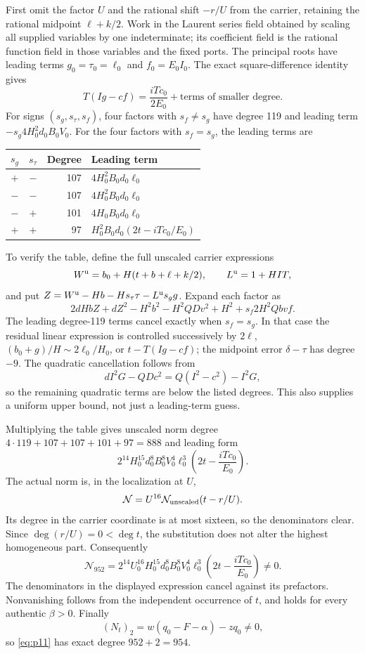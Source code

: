 \documentclass[11pt,a4paper]{article}
\theoremstyle{definition}
\theoremstyle{remark}
\numberwithin{equation}{section}
\begin{document}
First omit the factor $U$ and the rational shift $-r/U$ from the
carrier, retaining the rational midpoint $\ell+k/2$. Work in the
Laurent series field obtained by scaling all supplied variables by
one indeterminate; its coefficient field is the rational function
field in those variables and the fixed ports. The principal roots
have leading terms $g_0=\tau_0=\ell_0$ and $f_0=E_0I_0$.
The exact square-difference identity gives
\[
 T(Ig-cf)=\frac{iTc_0}{2E_0}+\text{terms of smaller degree}.
\]
For signs $(s_g,s_\tau,s_f)$, four factors with $s_f\ne s_g$
have degree 119 and leading term
$-s_g4H_0^2d_0B_0V_0$.
For the four factors with $s_f=s_g$, the leading terms are
\begin{center}
\begin{tabular}{@{}ccrl@{}}
\toprule
$s_g$ & $s_\tau$ & Degree & Leading term\\
\midrule
$+$ & $-$ & 107 & $4H_0^2B_0d_0\ell_0$\\
$-$ & $-$ & 107 & $4H_0^2B_0d_0\ell_0$\\
$-$ & $+$ & 101 & $4H_0B_0d_0\ell_0$\\
$+$ & $+$ & 97 & $H_0^2B_0d_0(2t-iTc_0/E_0)$\\
\bottomrule
\end{tabular}
\end{center}
To verify the table, define the full unscaled carrier expressions
\[
 W^{\rm u}=b_0+H(t+b+\ell+k/2),\qquad
 L^{\rm u}=1+HIT,
\]
and put $Z=W^{\rm u}-Hb-Hs_\tau\tau-L^{\rm u}s_gg$.
Expand each factor as
\[
 2dHbZ+dZ^2-H^2b^2-H^2QDv^2+H^2
       +s_f2H^2Qbvf.
\]
The leading degree-119 terms cancel exactly when $s_f=s_g$.
In that case the residual linear expression is controlled successively
by $2\ell$, $(b_0+g)/H\sim2\ell_0/H_0$, or
$t-T(Ig-cf)$; the midpoint error $\delta-\tau$ has degree $-9$.
The quadratic cancellation follows from
\[
 dI^2G-QDc^2=Q(I^2-c^2)-I^2G,
\]
so the remaining quadratic terms are below the listed degrees.
This also supplies a uniform upper bound, not just a leading-term guess.

Multiplying the table gives unscaled norm degree
$4\cdot119+107+107+101+97=888$ and leading form
\[
 2^{14}H_0^{15}d_0^8B_0^8V_0^4\ell_0^3
 \left(2t-\frac{iTc_0}{E_0}\right).
\]
The actual norm is, in the localization at $U$,
\[
 \mathcal N=U^{16}\mathcal N_{\rm unscaled}(t-r/U).
\]
Its degree in the carrier coordinate is at most sixteen, so the
denominators clear. Since $\deg(r/U)=0<\deg t$, the substitution
does not alter the highest homogeneous part. Consequently
\begin{equation}
 \mathcal N_{952}
 =2^{14}U_0^{16}H_0^{15}d_0^8B_0^8V_0^4\ell_0^3
 \left(2t-\frac{iTc_0}{E_0}\right)\ne0.
 \label{eq:lead952}
\end{equation}
The denominators in the displayed expression cancel against its
prefactors. Nonvanishing follows from the independent occurrence of
$t$, and holds for every authentic $\beta>0$. Finally
\[
 (N_t)_2=w(q_0-F-\alpha)-zq_0\ne0,
\]
so \eqref{eq:p11} has exact degree $952+2=954$.
\end{document}
